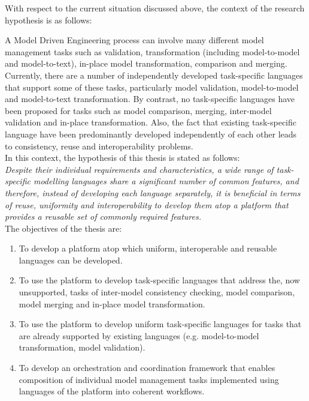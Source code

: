 With respect to the current situation discussed above, the context of the research hypothesis is as follows:

A Model Driven Engineering process can involve many different model management tasks such as validation, transformation (including model-to-model and model-to-text), in-place model transformation, comparison and merging. Currently, there are a number of independently developed task-specific languages that support some of these tasks, particularly model validation, model-to-model and model-to-text transformation. By contrast, no task-specific languages have been proposed for tasks such as model comparison, merging, inter-model validation and in-place transformation. Also, the fact that existing task-specific language have been predominantly developed independently of each other leads to consistency, reuse and interoperability problems.\\

In this context, the hypothesis of this thesis is stated as follows:\\

\textit{Despite their individual requirements and characteristics, a wide range of task-specific modelling languages share a significant number of common features, and therefore, instead of developing each language separately, it is beneficial in terms of reuse, uniformity and interoperability to develop them atop a platform that provides a reusable set of commonly required features.}\\
 
The objectives of the thesis are:

\begin{enumerate}
	\item To develop a platform atop which uniform, interoperable and reusable languages can be developed.
	\item To use the platform to develop task-specific languages that address the, now unsupported, tasks of inter-model consistency checking, model comparison, model merging and in-place model transformation.
	\item To use the platform to develop uniform task-specific languages for tasks that are already supported by existing languages (e.g. model-to-model transformation, model validation).
	\item To develop an orchestration and coordination framework that enables composition of individual model management tasks implemented using languages of the platform into coherent workflows. 
\end{enumerate}
